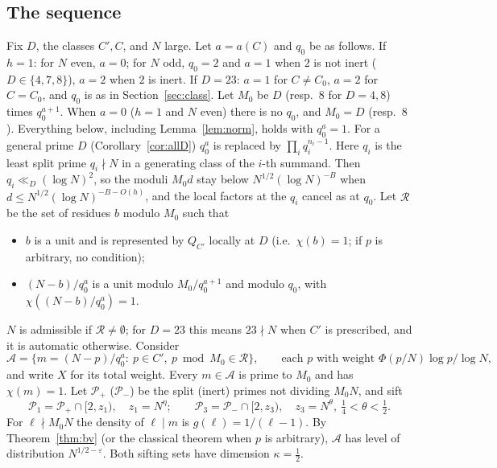 \documentclass[11pt]{amsart}
\theoremstyle{remark}
\newcommand{\e}{\varepsilon}
\newcommand{\cA}{\mathcal A}
\newcommand{\cP}{\mathcal P}
\begin{document}
\subsection{The sequence}
Fix $D$, the classes $C',C$, and $N$ large. Let $a=a(C)$ and $q_0$ be as follows. If $h=1$: for $N$ even, $a=0$; for $N$ odd, $q_0=2$ and $a=1$ when $2$ is not inert ($D\in\{4,7,8\}$), $a=2$ when $2$ is inert. If $D=23$: $a=1$ for $C\ne C_0$, $a=2$ for $C=C_0$, and $q_0$ is as in Section~\ref{sec:class}. Let $M_0$ be $D$ (resp.\ $8$ for $D=4,8$) times $q_0^{a+1}$. When $a=0$ ($h=1$ and $N$ even) there is no $q_0$, and $M_0=D$ (resp.\ $8$). Everything below, including Lemma~\ref{lem:norm}, holds with $q_0^a=1$. For a general prime $D$ (Corollary~\ref{cor:allD}) $q_0^a$ is replaced by $\prod_iq_i^{n_i-1}$. Here $q_i$ is the least split prime $q_i\nmid N$ in a generating class of the $i$-th summand. Then $q_i\ll_D(\log N)^2$, so the moduli $M_0d$ stay below $N^{1/2}(\log N)^{-B}$ when $d\le N^{1/2}(\log N)^{-B-O(h)}$, and the local factors at the $q_i$ cancel as at $q_0$. Let $\mathcal R$ be the set of residues $b$ modulo $M_0$ such that
\begin{itemize}[leftmargin=1.5em]
\item $b$ is a unit and is represented by $Q_{C'}$ locally at $D$ (i.e.\ $\chi(b)=1$; if $p$ is arbitrary, no condition);
\item $(N-b)/q_0^a$ is a unit modulo $M_0/q_0^{a+1}$ and modulo $q_0$, with $\chi((N-b)/q_0^{a})=1$.
\end{itemize}
$N$ is admissible if $\mathcal R\neq\emptyset$; for $D=23$ this means $23\nmid N$ when $C'$ is prescribed, and it is automatic otherwise. Consider
\[
\cA=\bigl\{m=(N-p)/q_0^{a}:\ p\in C',\ p\bmod M_0\in\mathcal R\bigr\},\qquad\text{each $p$ with weight }\Phi(p/N)\log p/\log N,
\]
and write $X$ for its total weight. Every $m\in\cA$ is prime to $M_0$ and has $\chi(m)=1$. Let $\cP_+$ ($\cP_-$) be the split (inert) primes not dividing $M_0N$, and sift
\[
\cP_1=\cP_+\cap[2,z_1),\quad z_1=N^{\eta};\qquad \cP_3=\cP_-\cap[2,z_3),\quad z_3=N^{\theta},\ \tfrac14<\theta<\tfrac12 .
\]
For $\ell\nmid M_0N$ the density of $\ell\mid m$ is $g(\ell)=1/(\ell-1)$. By Theorem~\ref{thm:bv} (or the classical theorem when $p$ is arbitrary), $\cA$ has level of distribution $N^{1/2-\e}$. Both sifting sets have dimension $\kappa=\frac12$.
\end{document}
